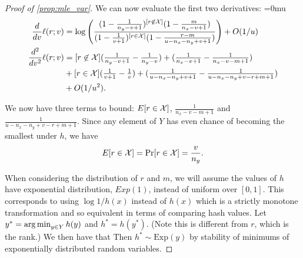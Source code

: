 \begin{proof}[Proof of \cref{prop:mle_var}]


   We can now evaluate the first two derivatives:
   {
      \thinmuskip=0mu
      \begin{align}
         \frac{d}{dv}\ell(r;v)
         &=
         \log\left(\frac{(1-\frac1{n_y-v+1})^{[r\not\in\mathcal{X}]}(1-\frac{m}{n_x-v+1})}{(1-\frac 1{v+1})^{[r\in\mathcal{X}]}(1-\frac{r-m}{u-n_x-n_y+v+1})}\right) + O(1/u)
         \label{eq:deriv1}
         \\
         \frac{d^2}{dv^2}\ell(r;v)
        &=
          [r\not\in\mathcal{X}](\tfrac1{n_y-v+1}-\tfrac1{n_y-v})
         + (\tfrac1{n_x-v+1}-\tfrac1{n_x-v-m+1})
      \\&+[r\in\mathcal{X}](\tfrac1{v+1}-\tfrac1{v})
         + (\tfrac1{u-n_x-n_y+v+1}-\tfrac1{u-n_x-n_y+v-r+m+1})
      \\&+ O(1/u^2)
         \label{eq:deriv2}
         .
      \end{align}
      \vspace{-1em}
   }

   We now have three terms to bound:
   $E[r\in\mathcal{X}]$, $\tfrac1{n_x-v-m+1}$ and $\tfrac1{u-n_x-n_y+v-r+m+1}$.
   Since any element of $Y$ has even chance of becoming the smallest under $h$, we have
   \[E[r\in\mathcal{X}] = \Pr[r\in\mathcal{X}] = \frac{v}{n_y}. \]

   When considering the distribution of $r$ and $m$, we will assume the values of $h$ have exponential distribution, $Exp(1)$, instead of uniform over $[0,1]$.
   This corresponds to using $\log1/h(x)$ instead of $h(x)$ which is a strictly monotone transformation and so equivalent in terms of comparing hash values.
   Let $y^* = \operatorname*{arg\,min}_{y\in Y}h(y)$ and $h^* = h(y^*)$.
   (Note this is different from $r$, which is the rank.)
   We then have that Then $h^* \sim \text{Exp}(y)$ by stability of minimums of exponentially distributed random variables.


\end{proof}
